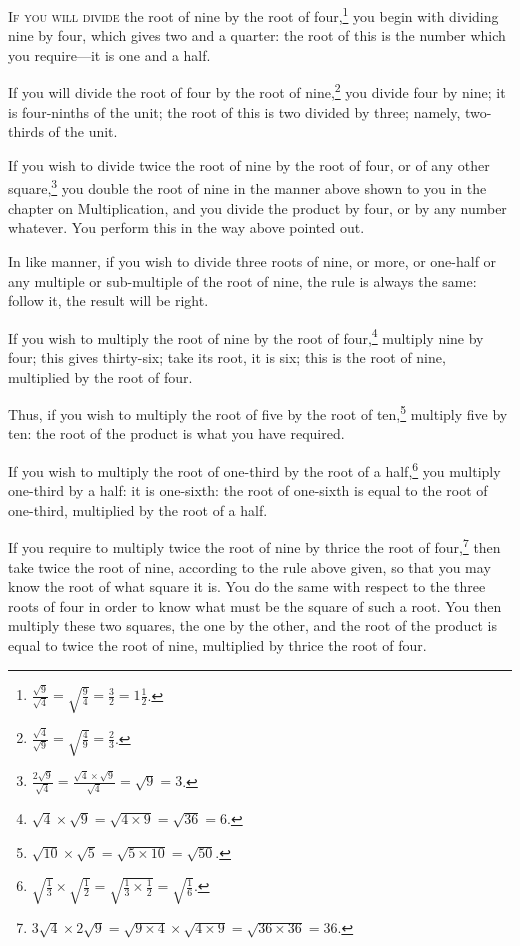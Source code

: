 \lettrine{I}{f you will divide} the root of nine by the root of four,\footnote{$\frac{\sqrt{9}}{\sqrt{4}} = \sqrt{\frac{9}{4}} = \frac{3}{2} = 1\frac{1}{2}$.} you begin with dividing nine by four, which gives two and a quarter: the root of this is the number which you require---it is one and a half.

If you will divide the root of four by the root of nine,\footnote{$\frac{\sqrt{4}}{\sqrt{9}} = \sqrt{\frac{4}{9}} = \frac{2}{3}$.} you divide four by nine; it is four-ninths of the unit; the root of this is two divided by three; namely, two-thirds of the unit.

If you wish to divide twice the root of nine by the root of four, or of any other square,\footnote{$\frac{2\sqrt{9}}{\sqrt{4}} = \frac{\sqrt{4} \times \sqrt{9}}{\sqrt{4}} = \sqrt{9} = 3$.} you double the root of nine in the manner above shown to you in the chapter on Multiplication, and you divide the product by four, or by any number whatever. You perform this in the way above pointed out.

In like manner, if you wish to divide three roots of nine, or more, or one-half or any multiple or sub-multiple of the root of nine, the rule is always the same: follow it, the result will be right.

If you wish to multiply the root of nine by the root of four,\footnote{$\sqrt{4} \times \sqrt{9} = \sqrt{4 \times 9} = \sqrt{36} = 6$.} multiply nine by four; this gives thirty-six; take its root, it is six; this is the root of nine, multiplied by the root of four.

Thus, if you wish to multiply the root of five by the root of ten,\footnote{$\sqrt{10} \times \sqrt{5} = \sqrt{5 \times 10} = \sqrt{50}$.} multiply five by ten: the root of the product is what you have required.

If you wish to multiply the root of one-third by the root of a half,\footnote{$\sqrt{\frac{1}{3}} \times \sqrt{\frac{1}{2}} = \sqrt{\frac{1}{3} \times \frac{1}{2}} = \sqrt{\frac{1}{6}}$.} you multiply one-third by a half: it is one-sixth: the root of one-sixth is equal to the root of one-third, multiplied by the root of a half.

If you require to multiply twice the root of nine by thrice the root of four,\footnote{$3\sqrt{4} \times 2\sqrt{9} = \sqrt{9 \times 4} \times \sqrt{4 \times 9} = \sqrt{36 \times 36} = 36$.} then take twice the root of nine, according to the rule above given, so that you may know the root of what square it is. You do the same with respect to the three roots of four in order to know what must be the square of such a root. You then multiply these two squares, the one by the other, and the root of the product is equal to twice the root of nine, multiplied by thrice the root of four.

